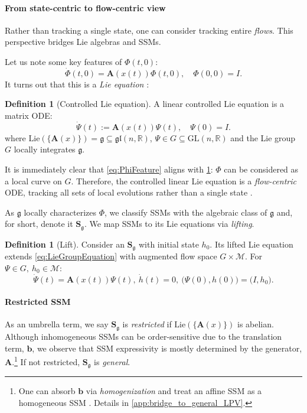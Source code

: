 \documentclass{article}
\theoremstyle{plain}
\theoremstyle{definition}
\newtheorem{definition}[theorem]{Definition}
\theoremstyle{remark}
\newcommand{\fr}[1]{\mathfrak{#1}}
\newcommand{\mcal}[1]{\mathcal{#1}}
\newcommand{\mbf}[1]{\mathbf{#1}}
\newcommand{\bb}[1]{\mathbb{#1}}
\newcommand{\G}[2]{\text{#1}(#2)}
\begin{document}
\paragraph{From state-centric to flow-centric view}
\label{sec:flow_centric_realization}
Rather than tracking a single state, one can consider tracking entire \emph{flows}.
This perspective bridges Lie algebras and SSMs.

Let us note some key features of $\Phi(t,0)$:
\begin{equation}
\label{eq:PhiFeature}
    \dot{\Phi}(t,0) = \mbf{A}(x(t))\Phi(t,0),
    \quad
    \Phi(0,0) = I.
\end{equation}
It turns out that this is a \emph{Lie equation} \cite{iserles2008magnus}:
\begin{definition}[Controlled Lie equation]
\label{def:LieGroupEquation}
A linear controlled Lie equation is a matrix ODE:
\begin{equation}
\label{eq:LieGroupEquation}
    \dot{\Psi}(t) := \mbf{A}(x(t)) \Psi(t),
    \quad
    \Psi(0) = I.
\end{equation}
where $\text{Lie}(\{\mbf{A}(x)\}) = \fr{g} \subseteq \fr{gl}(n,\bb{R})$, $\Psi \in G \subseteq \G{GL}{n,\bb{R}}$ and the Lie group $G$ locally integrates $\fr{g}$.
\end{definition}
It is immediately clear that \cref{eq:PhiFeature} aligns with \cref{def:LieGroupEquation}:
$\Phi$ can be considered as a local curve on $G$.
Therefore, the controlled linear Lie equation is a \emph{flow-centric} ODE,
tracking all sets of local evolutions rather than a single state \cite{jurdjevic1972control}.

As $\fr{g}$ locally characterizes $\Phi$,
we classify SSMs with the algebraic class of $\fr{g}$
and, for short, denote it $\mbf{S}_\fr{g}$.
We map SSMs to its Lie equations via \emph{lifting}.
\begin{definition}[Lift]
    Consider an $\mbf{S}_\fr{g}$ with initial state $h_0$.
    Its lifted Lie equation extends \cref{eq:LieGroupEquation}
    with augmented flow space $G \times \mcal{M}$.
    For $\Psi \in G, \: h_0 \in \mcal{M}$:
    \begin{equation*}
        \dot{\Psi}(t) = \mbf{A}(x(t))\Psi(t),
        \
        \dot{h}(t) = 0,
        \
        \bigl( \Psi(0), h(0) \bigr) = \bigl( I, h_0 \bigr).
    \end{equation*}
\end{definition}
\paragraph{Restricted SSM}
\label{sec:main_affine_vector_field}
As an umbrella term, we say $\mbf{S}_\fr{g}$ is \emph{restricted}
if $\text{Lie}(\{\mbf{A}(x)\})$ is abelian.
Although inhomogeneous SSMs can be order-sensitive due to the translation term, $\mbf{b}$,
we observe that SSM expressivity is mostly determined by the generator, $\mbf{A}$.\footnote{
One can absorb $\mbf{b}$ via \emph{homogenization} and treat an affine SSM
as a homogeneous SSM \cite{krener1977decomposition}. Details in \cref{app:bridge_to_general_LPV}.}
If not restricted, $\mbf{S}_\fr{g}$ is \emph{general}.
\end{document}
